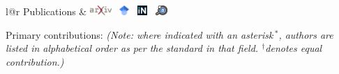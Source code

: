 \documentclass[letterpaper,11pt]{article}
\newcommand{\arxivlogo}{\includegraphics[height=1em]{figures/arxiv-logo.pdf}}
\newcommand{\inspirelogo}{\includegraphics[height=1em]{figures/inspire-logo.pdf}}
\newcommand{\adslogo}{\includegraphics[height=1em]{figures/ads-logo.pdf}}
\newcommand{\scholarlogo}{\includegraphics[height=1em]{figures/gscholar-logo.pdf}}
\begin{document}


\noindent
\begin{tabular*}{\textwidth}{l@{\extracolsep{\fill}}r}
\large {\sc \Large{Publications}} & 
\href{https://arxiv.org/a/mishrasharma_s_1.html}{\arxivlogo}  \
\href{https://scholar.google.com/citations?hl=en&user=hJVjhlwAAAAJ&view_op=list_works&sortby=pubdate}{\scholarlogo}  \ 
\href{https://inspirehep.net/authors/1394493}{\inspirelogo}  \ 
\href{https://ui.adsabs.harvard.edu/search/p_=0&q=author%3A%22Mishra-Sharma%2C%20Siddharth%22&sort=date%20desc%2C%20bibcode%20desc}{\adslogo} \\
\hline
\end{tabular*}\vspace{3.5mm}

\noindent
Primary contributions: \emph{(Note: where indicated with an asterisk\,$^*$, authors are listed in alphabetical order as per the standard in that field. $^{\dagger}$denotes equal contribution.)}
\end{document}
